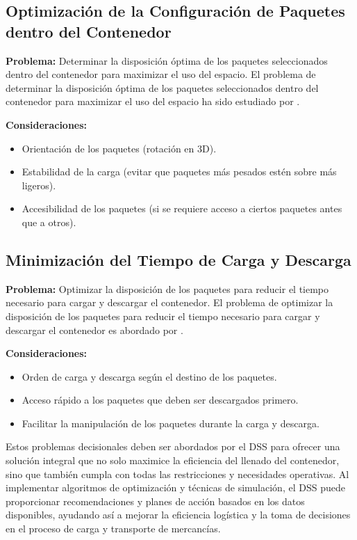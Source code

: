 \documentclass[9pt,a4paper]{rho}
\begin{document}
\subsection{Optimización de la Configuración de Paquetes dentro del Contenedor}

\textbf{Problema:} Determinar la disposición óptima de los paquetes seleccionados dentro del contenedor para maximizar el uso del espacio. El problema de determinar la disposición óptima de los paquetes seleccionados dentro del contenedor para maximizar el uso del espacio ha sido estudiado por \textcite{zhao2016comparative}.

\textbf{Consideraciones:}
\begin{itemize}
    \item Orientación de los paquetes (rotación en 3D).
    \item Estabilidad de la carga (evitar que paquetes más pesados estén sobre más ligeros).
    \item Accesibilidad de los paquetes (si se requiere acceso a ciertos paquetes antes que a otros).
\end{itemize}

\subsection{Minimización del Tiempo de Carga y Descarga}

\textbf{Problema:} Optimizar la disposición de los paquetes para reducir el tiempo necesario para cargar y descargar el contenedor. El problema de optimizar la disposición de los paquetes para reducir el tiempo necesario para cargar y descargar el contenedor es abordado por \textcite{bastidas}.

\textbf{Consideraciones:}
\begin{itemize}
    \item Orden de carga y descarga según el destino de los paquetes.
    \item Acceso rápido a los paquetes que deben ser descargados primero.
    \item Facilitar la manipulación de los paquetes durante la carga y descarga.
\end{itemize}

Estos problemas decisionales deben ser abordados por el DSS para ofrecer una solución integral que no solo maximice la eficiencia del llenado del contenedor, sino que también cumpla con todas las restricciones y necesidades operativas. Al implementar algoritmos de optimización y técnicas de simulación, el DSS puede proporcionar recomendaciones y planes de acción basados en los datos disponibles, ayudando así a mejorar la eficiencia logística y la toma de decisiones en el proceso de carga y transporte de mercancías.
\end{document}
